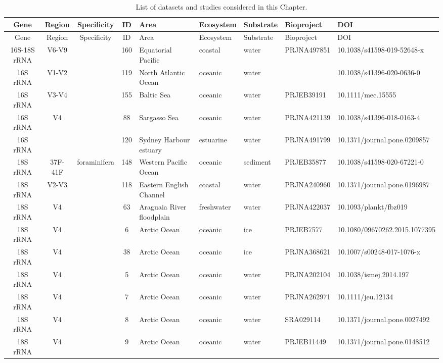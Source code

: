 \begin{longtable}{cccclllll}
\caption{List of datasets and studies considered in this Chapter.} \\ 
  \hline
  Gene & Region & Specificity & ID & Area & Ecosystem & Substrate & Bioproject & DOI \\
 \endfirsthead 
 \hline 
 Gene & Region & Specificity & ID & Area & Ecosystem & Substrate & Bioproject & DOI \\
 \hline 
 \endhead 
 \hline 
 \endfoot 
  \endlastfoot 
 \hline
16S-18S rRNA & V6-V9 &  & 160 & Equatorial Pacific & coastal & water & PRJNA497851 & 10.1038/s41598-019-52648-x \\ 
  16S rRNA & V1-V2 &  & 119 & North Atlantic Ocean & oceanic & water &  & 10.1038/s41396-020-0636-0 \\ 
  16S rRNA & V3-V4 &  & 155 & Baltic Sea & oceanic & water & PRJEB39191 & 10.1111/mec.15555 \\ 
  16S rRNA & V4 &  & 88 & Sargasso Sea & oceanic & water & PRJNA421139  & 10.1038/s41396-018-0163-4 \\ 
  16S rRNA &  &  & 120 & Sydney Harbour estuary & estuarine & water & PRJNA491799 & 10.1371/journal.pone.0209857 \\ 
  18S rRNA & 37F-41F & foraminifera & 148 & Western Pacific Ocean & oceanic & sediment & PRJEB35877 & 10.1038/s41598-020-67221-0 \\ 
  18S rRNA & V2-V3 &  & 118 & Eastern English Channel & coastal & water & PRJNA240960 & 10.1371/journal.pone.0196987 \\ 
  18S rRNA & V4 &  & 63 & Araguaia River floodplain & freshwater & water & PRJNA422037 & 10.1093/plankt/fbz019 \\ 
  18S rRNA & V4 &  & 6 & Arctic Ocean & oceanic & ice & PRJEB7577 & 10.1080/09670262.2015.1077395 \\ 
  18S rRNA & V4 &  & 38 & Arctic Ocean & oceanic & ice & PRJNA368621 & 10.1007/s00248-017-1076-x \\ 
  18S rRNA & V4 &  & 5 & Arctic Ocean & oceanic & water & PRJNA202104 & 10.1038/ismej.2014.197 \\ 
  18S rRNA & V4 &  & 7 & Arctic Ocean & oceanic & water & PRJNA262971 & 10.1111/jeu.12134 \\ 
  18S rRNA & V4 &  & 8 & Arctic Ocean & oceanic & water & SRA029114 & 10.1371/journal.pone.0027492 \\ 
  18S rRNA & V4 &  & 9 & Arctic Ocean & oceanic & water & PRJEB11449 & 10.1371/journal.pone.0148512 \\ 

\end{longtable}
